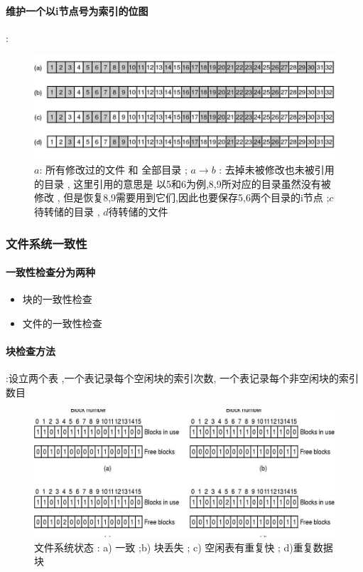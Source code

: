 \documentclass[UTF8,a4paper]{ctexart}
\begin{document}
\paragraph{维护一个以i节点号为索引的位图}:
\begin{figure}[H]
	\centering
	\includegraphics[scale = 0.6]{assets/ModernOperatingSystems/2018-01-08-19-21-56.png}
	\caption{$a$: 所有修改过的文件 和 全部目录 ; $a\to b$ : 去掉未被修改也未被引用的目录 , 这里引用的意思是 以5和6为例,8,9所对应的目录虽然没有被修改 , 但是恢复8,9需要用到它们,因此也要保存5,6两个目录的i节点 ;$c$待转储的目录 , $d$待转储的文件}
\end{figure}

\subsubsection{文件系统一致性}
\paragraph{一致性检查分为两种}
\begin{itemize}
	\item 块的一致性检查
	\item 文件的一致性检查
\end{itemize}

\paragraph{块检查方法}:设立两个表 ,一个表记录每个空闲块的索引次数, 一个表记录每个非空闲块的索引数目

\begin{figure}[H]
	\centering
	\includegraphics[scale = 0.5]{assets/ModernOperatingSystems/2018-01-08-19-30-43.png}
	\caption{文件系统状态 : a) 一致  ;b) 块丢失 ; c) 空闲表有重复快 ; d)重复数据块}
\end{figure}
\end{document}
